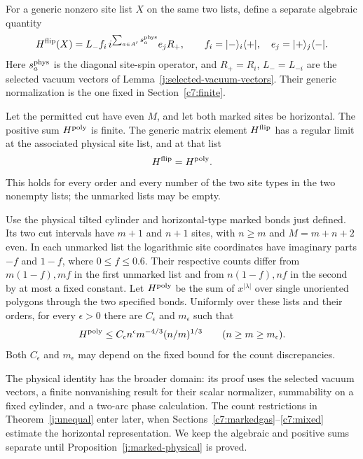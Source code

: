 For a generic nonzero site list $X$ on the same two lists, define a
separate algebraic quantity
\begin{equation}\label{j:marked-flip-definition}
 H^{\rm flip}(X)=
 L_- f_i\, i^{\sum_{a\in A'}s_a^{\rm phys}} e_j R_+,\qquad
 f_i=|-\rangle_i\langle+|,\quad e_j=|+\rangle_j\langle-|.
\end{equation}
Here $s_a^{\rm phys}$ is the diagonal site-spin operator, and
$R_+=R_i$, $L_-=L_{-i}$ are the selected vacuum vectors of
Lemma~\ref{j:selected-vacuum-vectors}. Their generic normalization
is the one fixed in Section~\ref{c7:finite}.

\begin{proposition}\label{j:marked-physical}
Let the permitted cut have even $M$, and let both marked sites be
horizontal. The positive sum $H^{\rm poly}$ is finite. The generic
matrix element $H^{\rm flip}$ has a regular limit at the associated
physical site list, and at that list
\[
 H^{\rm flip}=H^{\rm poly}.
\]
This holds for every order and every number of the two site types in
the two nonempty lists; the unmarked lists may be empty.
\end{proposition}

\begin{theorem}\label{j:unequal}
Use the physical tilted cylinder and horizontal-type marked bonds
just defined. Its two cut intervals have $m+1$ and $n+1$
sites, with $n\ge m$ and $M=m+n+2$ even. In each unmarked list the logarithmic site
coordinates have imaginary parts $-f$ and $1-f$, where $0\le f\le0.6$. Their respective
counts differ from $m(1-f),mf$ in the first unmarked list and from
$n(1-f),nf$ in the second by at most a fixed constant. Let $H^{\rm poly}$
be the sum of $x^{|\lambda|}$ over single unoriented polygons through
the two specified bonds. Uniformly over these lists and their orders, for
every $\epsilon>0$ there are $C_\epsilon$ and $m_\epsilon$ such that
\[
 H^{\rm poly}\le C_\epsilon n^\epsilon m^{-4/3}(n/m)^{1/3}
 \qquad(n\ge m\ge m_\epsilon).
\]
Both $C_\epsilon$ and $m_\epsilon$ may depend on the fixed bound for
the count discrepancies.
\end{theorem}

The physical identity has the broader domain: its proof uses the
selected vacuum vectors, a finite nonvanishing result for their scalar
normalizer, summability on a fixed cylinder, and a two-arc phase
calculation. The count restrictions in Theorem~\ref{j:unequal} enter
later, when Sections~\ref{c7:markedgas}--\ref{c7:mixed} estimate the
horizontal representation. We keep the algebraic and positive sums
separate until Proposition~\ref{j:marked-physical} is proved.

